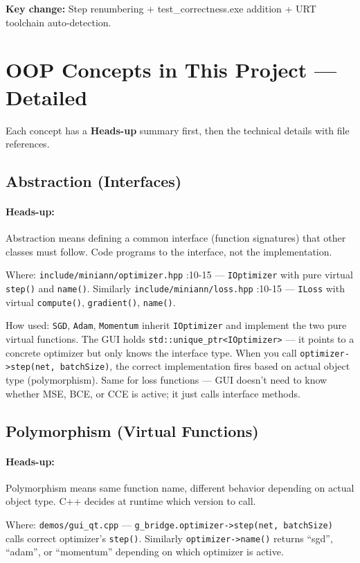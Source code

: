 \documentclass[12pt]{article}
\begin{document}
\textbf{Key change:} Step renumbering + test\_correctness.exe addition + URT toolchain auto-detection.

\section{OOP Concepts in This Project — Detailed}
Each concept has a \textbf{Heads-up} summary first, then the technical details with file references.

\subsection{Abstraction (Interfaces)}
\paragraph{Heads-up:} Abstraction means defining a common interface (function signatures) that other classes must follow. Code programs to the interface, not the implementation.

Where: \texttt{include/miniann/optimizer.hpp} :10-15 — \texttt{IOptimizer} with pure virtual \texttt{step()} and \texttt{name()}. Similarly \texttt{include/miniann/loss.hpp} :10-15 — \texttt{ILoss} with virtual \texttt{compute()}, \texttt{gradient()}, \texttt{name()}.

How used: \texttt{SGD}, \texttt{Adam}, \texttt{Momentum} inherit \texttt{IOptimizer} and implement the two pure virtual functions. The GUI holds \texttt{std::unique\_ptr<IOptimizer>} — it points to a concrete optimizer but only knows the interface type. When you call \texttt{optimizer->step(net, batchSize)}, the correct implementation fires based on actual object type (polymorphism). Same for loss functions — GUI doesn't need to know whether MSE, BCE, or CCE is active; it just calls interface methods.

\subsection{Polymorphism (Virtual Functions)}
\paragraph{Heads-up:} Polymorphism means same function name, different behavior depending on actual object type. C++ decides at runtime which version to call.

Where: \texttt{demos/gui\_qt.cpp} — \texttt{g\_bridge.optimizer->step(net, batchSize)} calls correct optimizer's \texttt{step()}. Similarly \texttt{optimizer->name()} returns ``sgd'', ``adam'', or ``momentum'' depending on which optimizer is active.
\end{document}
